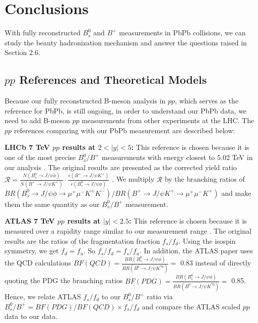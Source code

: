 \chapter{Conclusions}

With fully reconstructed $B^0_s$ and $B^+$ measurements in PbPb collisions, we can study the beauty hadronization mechanism and answer the questions raised in Section 2.6.

\section{$pp$ References and Theoretical Models}

Because our fully reconstructed B-meson analysis in $pp$, which serves as the reference for PbPb, is still ongoing, in order to understand our PbPb data, we need to add B-meson $pp$ measurements from other experiments at the LHC. The $pp$ references comparing with our PbPb measurement are described below:

\textbf{LHCb 7 TeV $pp$ results at $2 < |y| < 5$:} This reference is chosen because it is one of the most precise $B^0_s/B^+$ measurements with energy closest to 5.02 TeV in our analysis \cite{LHCbFF}. The original results are presented as the corrected yield ratio $\mathcal{R} = \frac{N(B^0_s \rightarrow J/\psi \phi)}{N(B^+ \rightarrow J/\psi K^+)} \cdot \frac{\epsilon(B^+ \rightarrow J/\psi K^+)}{\epsilon(B^0_s \rightarrow J/\psi \phi)}$ \cite{LHCbFF}. We multiply $\mathcal{R}$ by the branching ratios of $BR(B^0_s \rightarrow J/\psi \phi \rightarrow \mu^+\mu^- K^+ K^-)/BR(B^+ \rightarrow J/\psi K^+ \rightarrow \mu^+\mu^- K^+)$ and make them the same quantity as our $B^0_s/B^+$ measurement.

\textbf{ATLAS 7 TeV $pp$ results at $|y| < 2.5$:} This reference is chosen because it is measured over a rapidity range similar to our measurement range \cite{ATLASPPRef}. The original results are the ratios of the fragmentation fraction $f_s/f_d$. Using the isospin symmetry, we get $f_d = f_u$. So $f_s/f_d = f_s/f_u$. In addition, the ATLAS paper uses the QCD calculations $BF(QCD) = \frac{BR(B^0_s \rightarrow J/\psi \phi)}{BR(B^0 \rightarrow J/\psi K^{*0})} =$ 0.83 instead of directly quoting the PDG the branching ratios $BF(PDG) = \frac{BR(B^0_s \rightarrow J/\psi \phi)}{BR(B^0 \rightarrow J/\psi K^{*0})} =$ 0.85. Hence, we relate ATLAS $f_s/f_d$ to our $B^0_s/B^+$ ratio via $B^0_s/B^+ = BF(PDG)/BF(QCD) \times f_s/f_d$ and compare the ATLAS scaled $pp$ data to our data.


